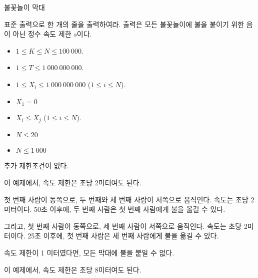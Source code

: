 \begin{problem}{불꽃놀이 막대}
	
	\OutputFile
	
	표준 출력으로 한 개의 줄을 출력하여라. 출력은 모든 불꽃놀이에 불을 붙이기 위한 음이 아닌 정수 속도 제한 $s$이다.
	
	\Constraints
	
	\begin{itemize}
		
		\item $1 \le K \le N \le 100\ 000$.
		\item $1 \le T \le 1\ 000\ 000\ 000$.
		\item $1 \le X_i \le 1\ 000\ 000\ 000$ ($1 \le i \le N$).
		\item $X_1 = 0$
		\item $X_i \le X_j$ ($1 \le i \le N$).	
	\end{itemize}
	
	
	\begin{itemize}
		\item $N \le 20$
	\end{itemize}
	
	\begin{itemize}
		\item $N \le 1\ 000$
	\end{itemize}
	
	
	추가 제한조건이 없다.
	
	\Examples
	
	\begin{example}
	\end{example}
	
	이 예제에서, 속도 제한은 초당 2미터여도 된다.
	
	첫 번째 사람이 동쪽으로, 두 번째와 세 번째 사람이 서쪽으로 움직인다. 속도는 초당 2미터이다. 50초 이후에, 두 번째 사람은 첫 번째 사람에게 불을 옮길 수 있다.
	
	그리고, 첫 번째 사람이 동쪽으로, 세 번째 사람이 서쪽으로 움직인다. 속도는 초당 2미터이다. 25초 이후에, 첫 번째 사람은 세 번째 사람에게 불을 옮길 수 있다.
	
	속도 제한이 1 미터였다면, 모든 막대에 불을 붙일 수 없다.

	\begin{example}
	\exmp{
		3 2 10
		0
		200 
		300
	}{%
		8
	}%
	\end{example}
	
	이 예제에서, 속도 제한은 초당 8미터여도 된다.
		

\end{problem}
